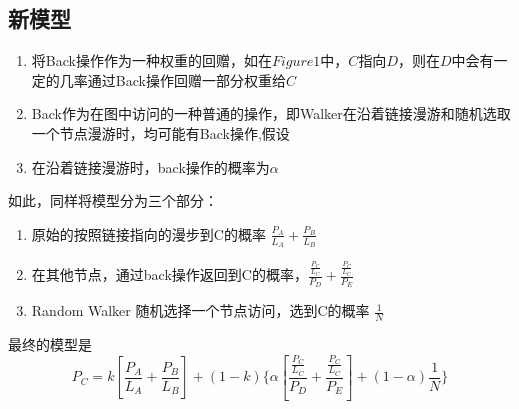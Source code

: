 \documentclass[a4paper]{ctexart}
\begin{document}
\begin{multicols}{2}
\section{新模型}
\begin{enumerate}
    \item 将Back操作作为一种权重的回赠，如在$Figure 1$中，$C$指向$D$，则在$D$中会有一定的几率通过Back操作回赠一部分权重给$C$
    \item Back作为在图中访问的一种普通的操作，即Walker在沿着链接漫游和随机选取一个节点漫游时，均可能有Back操作,假设
        \item 在沿着链接漫游时，back操作的概率为$\alpha$
\end{enumerate}

如此，同样将模型分为三个部分：
\begin{enumerate}
    \item 原始的按照链接指向的漫步到C的概率 $\frac{P_A}{L_A} + \frac{P_B}{L_B}$
    \item 在其他节点，通过back操作返回到C的概率，$\frac{\frac{P_C}{L_C}}{P_D} +\frac{\frac{P_C}{L_C}}{P_E}$ 
    \item Random Walker 随机选择一个节点访问，选到C的概率 $\frac{1}{N}$
\end{enumerate}
最终的模型是
$$
P_C = k[\frac{P_A}{L_A} + \frac{P_B}{L_B}] + 
    (1-k)
    \{
        \alpha [
        \frac{\frac{P_C}{L_C}}{P_D} +
        \frac{\frac{P_C}{L_C}}{P_E} 
        ]
        +
        (1-\alpha) \frac{1}{N}
    \}
$$


\end{multicols}
\end{document}
